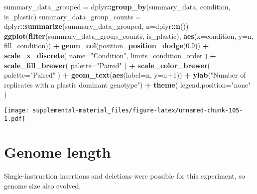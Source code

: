 \documentclass[]{book}
\newenvironment{Shaded}{\begin{snugshade}}{\end{snugshade}}
\newcommand{\DataTypeTok}[1]{\textcolor[rgb]{0.13,0.29,0.53}{#1}}
\newcommand{\DecValTok}[1]{\textcolor[rgb]{0.00,0.00,0.81}{#1}}
\newcommand{\FloatTok}[1]{\textcolor[rgb]{0.00,0.00,0.81}{#1}}
\newcommand{\KeywordTok}[1]{\textcolor[rgb]{0.13,0.29,0.53}{\textbf{#1}}}
\newcommand{\NormalTok}[1]{#1}
\newcommand{\OperatorTok}[1]{\textcolor[rgb]{0.81,0.36,0.00}{\textbf{#1}}}
\newcommand{\StringTok}[1]{\textcolor[rgb]{0.31,0.60,0.02}{#1}}
\begin{document}
\begin{Shaded}
\begin{Highlighting}[]
\NormalTok{summary_data_grouped =}\StringTok{ }\NormalTok{dplyr}\OperatorTok{::}\KeywordTok{group_by}\NormalTok{(summary_data, condition, is_plastic)}
\NormalTok{summary_data_group_counts =}\StringTok{ }\NormalTok{dplyr}\OperatorTok{::}\KeywordTok{summarize}\NormalTok{(summary_data_grouped, }\DataTypeTok{n=}\NormalTok{dplyr}\OperatorTok{::}\KeywordTok{n}\NormalTok{())}
\KeywordTok{ggplot}\NormalTok{(}\KeywordTok{filter}\NormalTok{(summary_data_group_counts, is_plastic), }\KeywordTok{aes}\NormalTok{(}\DataTypeTok{x=}\NormalTok{condition, }\DataTypeTok{y=}\NormalTok{n, }\DataTypeTok{fill=}\NormalTok{condition)) }\OperatorTok{+}
\StringTok{  }\KeywordTok{geom_col}\NormalTok{(}\DataTypeTok{position=}\KeywordTok{position_dodge}\NormalTok{(}\FloatTok{0.9}\NormalTok{)) }\OperatorTok{+}
\StringTok{  }\KeywordTok{scale_x_discrete}\NormalTok{(}
    \DataTypeTok{name=}\StringTok{"Condition"}\NormalTok{,}
    \DataTypeTok{limits=}\NormalTok{condition_order}
\NormalTok{  ) }\OperatorTok{+}
\StringTok{  }\KeywordTok{scale_fill_brewer}\NormalTok{(}
    \DataTypeTok{palette=}\StringTok{"Paired"}
\NormalTok{  ) }\OperatorTok{+}
\StringTok{  }\KeywordTok{scale_color_brewer}\NormalTok{(}
    \DataTypeTok{palette=}\StringTok{"Paired"}
\NormalTok{  ) }\OperatorTok{+}
\StringTok{  }\KeywordTok{geom_text}\NormalTok{(}\KeywordTok{aes}\NormalTok{(}\DataTypeTok{label=}\NormalTok{n, }\DataTypeTok{y=}\NormalTok{n}\OperatorTok{+}\DecValTok{1}\NormalTok{)) }\OperatorTok{+}
\StringTok{  }\KeywordTok{ylab}\NormalTok{(}\StringTok{"Number of replicates with a plastic dominant genotype"}\NormalTok{) }\OperatorTok{+}
\StringTok{  }\KeywordTok{theme}\NormalTok{(}
    \DataTypeTok{legend.position=}\StringTok{"none"}
\NormalTok{  )}
\end{Highlighting}
\end{Shaded}

\texttt{[image: supplemental-material\_files/figure-latex/unnamed-chunk-105-1.pdf]}

\hypertarget{genome-length}{%
\section{Genome length}\label{genome-length}}

Single-instruction insertions and deletions were possible for this experiment, so genome size also evolved.
\end{document}
